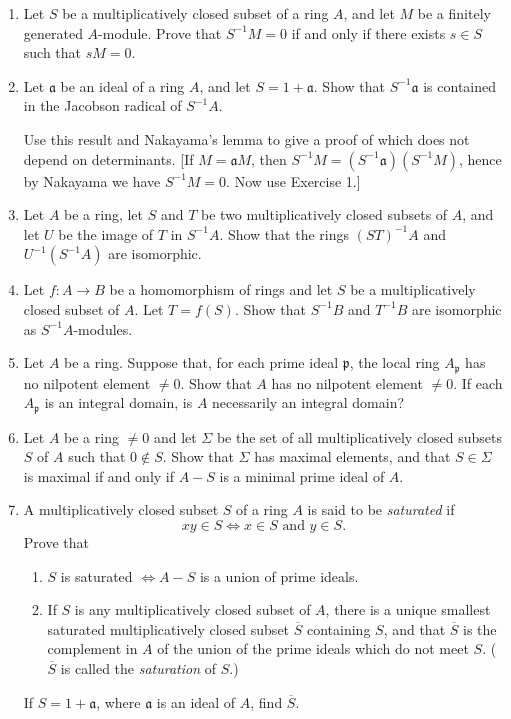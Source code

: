 \begin{enumerate}
\item Let $S$ be a multiplicatively closed subset of a ring $A$, and let $M$ be a finitely generated $A$-module. Prove that $S^{-1}M=0$ if and only if there exists $s\in S$ such that $sM=0$.

\item Let $\mathfrak a$ be an ideal of a ring $A$, and let $S=1+\mathfrak a$. Show that $S^{-1}\mathfrak a$ is contained in the Jacobson radical of $S^{-1}A$.

Use this result and Nakayama's lemma to give a proof of  which does not depend on determinants. [If $M=\mathfrak aM$, then $S^{-1}M=(S^{-1}\mathfrak a)(S^{-1}M)$, hence by Nakayama we have $S^{-1}M=0$. Now use Exercise 1.]

\item Let $A$ be a ring, let $S$ and $T$ be two multiplicatively closed subsets of $A$, and let $U$ be the image of $T$ in $S^{-1}A$. Show that the rings $(ST)^{-1}A$ and $U^{-1}(S^{-1}A)$ are isomorphic.

\item Let $f:A\longrightarrow B$ be a homomorphism of rings and let $S$ be a multiplicatively closed subset of $A$. Let $T=f(S)$. Show that $S^{-1}B$ and $T^{-1}B$ are isomorphic as $S^{-1}A$-modules.

\item Let $A$ be a ring. Suppose that, for each prime ideal $\mathfrak p$, the local ring $A_{\mathfrak p}$ has no nilpotent element $\neq0$. Show that $A$ has no nilpotent element $\neq0$. If each $A_{\mathfrak p}$ is an integral domain, is $A$ necessarily an integral domain?

\item Let $A$ be a ring $\neq0$ and let $\Sigma$ be the set of all multiplicatively closed subsets $S$ of $A$ such that $0\notin S$. Show that $\Sigma$ has maximal elements, and that $S\in\Sigma$ is maximal if and only if $A-S$ is a minimal prime ideal of $A$.

\item A multiplicatively closed subset $S$ of a ring $A$ is said to be \textit{saturated} if
\[
 xy\in S\Longleftrightarrow x\in S\text{ and }y\in S.
\]
Prove that
\begin{enumerate}
\renewcommand{\labelenumii}{\roman{enumii})}
\item $S$ is saturated $\Longleftrightarrow A-S$ is a union of prime ideals.
\item If $S$ is any multiplicatively closed subset of $A$, there is a unique smallest saturated multiplicatively closed subset $\overline S$ containing $S$, and that $\overline S$ is the complement in $A$ of the union of the prime ideals which do not meet $S$. ($\overline S$ is called the \textit{saturation} of $S$.)
\end{enumerate}
If $S=1+\mathfrak a$, where $\mathfrak a$ is an ideal of $A$, find $\overline S$.


\end{enumerate}
